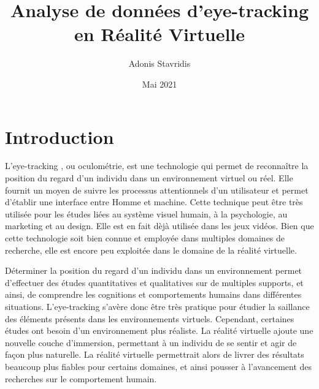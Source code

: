 \documentclass[hidelinks,12pt]{article}
\title{\textbf{Analyse de données d’eye-tracking en Réalité Virtuelle}}
\author{\Large{Adonis Stavridis}}
\date{Mai 2021}
\begin{document}

\maketitle
\tableofcontents
\pagebreak


\section{Introduction}

L'eye-tracking \cite{wiki_eye_tracking}, ou oculométrie, est une technologie
qui permet de reconnaître la position du regard d'un individu dans un
environnement virtuel ou réel. Elle fournit un moyen de suivre les processus
attentionnels d'un utilisateur et permet d'établir une interface entre
Homme et machine. Cette technique peut être très utilisée pour les études liées
au système visuel humain, à la psychologie, au marketing et au design. Elle est
en fait dèjà utilisée dans les jeux vidéos. Bien que cette technologie soit
bien connue et employée dans multiples domaines de recherche, elle est encore
peu exploitée dans le domaine de la réalité virtuelle.

\bigskip
Déterminer la position du regard d'un individu dans un environnement permet
d'effectuer des études quantitatives et qualitatives sur de multiples supports,
et ainsi, de comprendre les cognitions et comportements humains dans différentes
situations. L'eye-tracking s'avère donc être très pratique pour étudier la
saillance des éléments présents dans les environnements virtuels. Cependant,
certaines études ont besoin d'un environnement plus réaliste. La réalité
virtuelle ajoute une nouvelle couche d'immersion, permettant à un individu de
se sentir et agir de façon plus naturelle. La réalité virtuelle permettrait
alors de livrer des résultats beaucoup plus fiables pour certains domaines, et
ainsi pousser à l'avancement des recherches sur le comportement humain.
\end{document}
